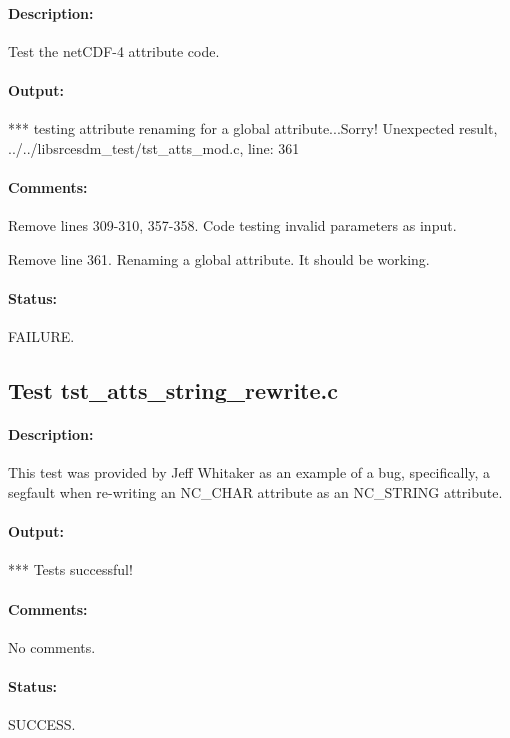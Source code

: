 \paragraph{Description:} Test the netCDF-4 attribute code.

\paragraph{Output:}

*** testing attribute renaming for a global attribute...Sorry! Unexpected result, ../../libsrcesdm\_test/tst\_atts\_mod.c, line: 361

\paragraph{Comments:} Remove lines 309-310, 357-358. Code testing invalid parameters as input.

Remove line 361. Renaming a global attribute. It should be working.

\paragraph{Status:} FAILURE.

\subsection{Test tst\_atts\_string\_rewrite.c}

\paragraph{Description:} This test was provided by Jeff Whitaker as an example of a bug, specifically, a segfault when re-writing an NC\_CHAR attribute as an NC\_STRING attribute.

\paragraph{Output:} *** Tests successful!

\paragraph{Comments:} No comments.

\paragraph{Status:} SUCCESS.

